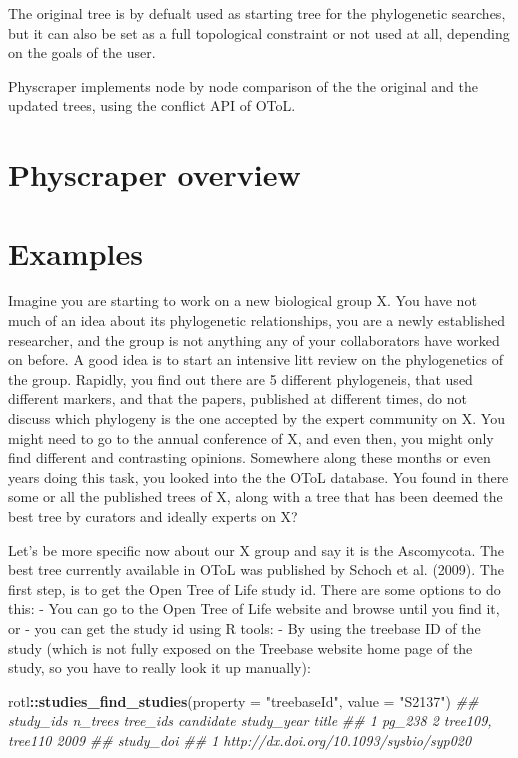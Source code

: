 \documentclass[10pt,a4paper,onecolumn]{article}
\newenvironment{Shaded}{\begin{snugshade}}{\end{snugshade}}
\newcommand{\CommentTok}[1]{\textcolor[rgb]{0.56,0.35,0.01}{\textit{#1}}}
\newcommand{\DataTypeTok}[1]{\textcolor[rgb]{0.13,0.29,0.53}{#1}}
\newcommand{\KeywordTok}[1]{\textcolor[rgb]{0.13,0.29,0.53}{\textbf{#1}}}
\newcommand{\NormalTok}[1]{#1}
\newcommand{\OperatorTok}[1]{\textcolor[rgb]{0.81,0.36,0.00}{\textbf{#1}}}
\newcommand{\StringTok}[1]{\textcolor[rgb]{0.31,0.60,0.02}{#1}}
\begin{document}
The original tree is by defualt used as starting tree for the
phylogenetic searches, but it can also be set as a full topological
constraint or not used at all, depending on the goals of the user.

Physcraper implements node by node comparison of the the original and
the updated trees, using the conflict API of OToL.

\hypertarget{physcraper-overview}{%
\section{Physcraper overview}\label{physcraper-overview}}

\hypertarget{examples}{%
\section{Examples}\label{examples}}

Imagine you are starting to work on a new biological group X. You have
not much of an idea about its phylogenetic relationships, you are a
newly established researcher, and the group is not anything any of your
collaborators have worked on before. A good idea is to start an
intensive litt review on the phylogenetics of the group. Rapidly, you
find out there are 5 different phylogeneis, that used different markers,
and that the papers, published at different times, do not discuss which
phylogeny is the one accepted by the expert community on X. You might
need to go to the annual conference of X, and even then, you might only
find different and contrasting opinions. Somewhere along these months or
even years doing this task, you looked into the the OToL database. You
found in there some or all the published trees of X, along with a tree
that has been deemed the best tree by curators and ideally experts on X?

Let's be more specific now about our X group and say it is the
Ascomycota. The best tree currently available in OToL was published by
Schoch et al. (2009). The first step, is to get the Open Tree of Life
study id. There are some options to do this: - You can go to the Open
Tree of Life website and browse until you find it, or - you can get the
study id using R tools: - By using the treebase ID of the study (which
is not fully exposed on the Treebase website home page of the study, so
you have to really look it up manually):

\begin{Shaded}
\begin{Highlighting}[]
\NormalTok{rotl}\OperatorTok{::}\KeywordTok{studies_find_studies}\NormalTok{(}\DataTypeTok{property =} \StringTok{"treebaseId"}\NormalTok{, }\DataTypeTok{value =} \StringTok{"S2137"}\NormalTok{)}
\CommentTok{##   study_ids n_trees         tree_ids candidate study_year title}
\CommentTok{## 1    pg_238       2 tree109, tree110                 2009      }
\CommentTok{##                                 study_doi}
\CommentTok{## 1 http://dx.doi.org/10.1093/sysbio/syp020}
\end{Highlighting}
\end{Shaded}
\end{document}
